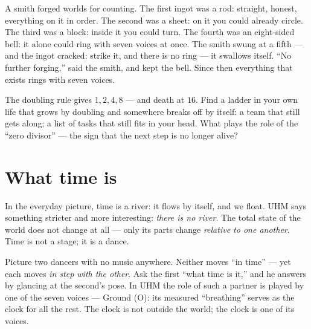 \documentclass[11pt,letterpaper]{article}
\begin{document}
\begin{talebox}
A smith forged worlds for counting. The first ingot was a rod:
straight, honest, everything on it in order. The second was a sheet:
on it you could already circle. The third was a block: inside it you
could turn. The fourth was an eight-sided bell: it alone could ring
with seven voices at once. The smith swung at a fifth --- and the
ingot cracked: strike it, and there is no ring --- it swallows
itself. ``No further forging,'' said the smith, and kept the bell.
Since then everything that exists rings with seven voices.
\end{talebox}

\begin{askbox}
The doubling rule gives $1, 2, 4, 8$ --- and death at $16$. Find a
ladder in your own life that grows by doubling and somewhere breaks
off by itself: a team that still gets along; a list of tasks that
still fits in your head. What plays the role of the ``zero divisor''
--- the sign that the next step is no longer alive?
\end{askbox}

\section{What time is}
\label{sec:time}

In the everyday picture, time is a river: it flows by itself, and we
float. UHM says something stricter and more interesting: \emph{there
is no river}. The total state of the world does not change at all ---
only its parts change \emph{relative to one another}. Time is not a
stage; it is a dance.

Picture two dancers with no music anywhere. Neither moves ``in time''
--- yet each moves \emph{in step with the other}. Ask the first
``what time is it,'' and he answers by glancing at the second's pose.
In UHM the role of such a partner is played by one of the seven
voices --- Ground (O): its measured ``breathing'' serves as the clock
for all the rest. The clock is not outside the world; the clock is
one of its voices.
\end{document}
